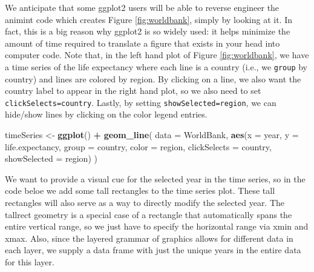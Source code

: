 \documentclass[12pt,]{article}
\newenvironment{Shaded}{\begin{snugshade}}{\end{snugshade}}
\newcommand{\KeywordTok}[1]{\textcolor[rgb]{0.13,0.29,0.53}{\textbf{#1}}}
\newcommand{\DataTypeTok}[1]{\textcolor[rgb]{0.13,0.29,0.53}{#1}}
\newcommand{\FloatTok}[1]{\textcolor[rgb]{0.00,0.00,0.81}{#1}}
\newcommand{\StringTok}[1]{\textcolor[rgb]{0.31,0.60,0.02}{#1}}
\newcommand{\OperatorTok}[1]{\textcolor[rgb]{0.81,0.36,0.00}{\textbf{#1}}}
\newcommand{\NormalTok}[1]{#1}
\theoremstyle{definition}
\theoremstyle{definition}
\theoremstyle{remark}
\begin{document}
We anticipate that some ggplot2 users will be able to reverse engineer
the animint code which creates Figure \ref{fig:worldbank}, simply by
looking at it. In fact, this is a big reason why ggplot2 is so widely
used: it helps minimize the amount of time required to translate a
figure that exists in your head into computer code. Note that, in the
left hand plot of Figure \ref{fig:worldbank}, we have a time series of
the life expectancy where each line is a country (i.e., we
\texttt{group} by country) and lines are colored by region. By clicking
on a line, we also want the country label to appear in the right hand
plot, so we also need to set \texttt{clickSelects=country}. Lastly, by
setting \texttt{showSelected=region}, we can hide/show lines by clicking
on the color legend entries.

\begin{Shaded}
\begin{Highlighting}[]
\NormalTok{timeSeries <-}\StringTok{ }\KeywordTok{ggplot}\NormalTok{() }\OperatorTok{+}\StringTok{ }\KeywordTok{geom_line}\NormalTok{(}
  \DataTypeTok{data =}\NormalTok{ WorldBank,}
  \KeywordTok{aes}\NormalTok{(}\DataTypeTok{x =}\NormalTok{ year, }\DataTypeTok{y =}\NormalTok{ life.expectancy,}
      \DataTypeTok{group =}\NormalTok{ country, }\DataTypeTok{color =}\NormalTok{ region,}
      \DataTypeTok{clickSelects =}\NormalTok{ country, }
      \DataTypeTok{showSelected =}\NormalTok{ region)}
\NormalTok{)}
\end{Highlighting}
\end{Shaded}

We want to provide a visual cue for the selected year in the time
series, so in the code beloe we add some tall rectangles to the time
series plot. These tall rectangles will also serve as a way to directly
modify the selected year. The tallrect geometry is a special case of a
rectangle that automatically spans the entire vertical range, so we just
have to specify the horizontal range via xmin and xmax. Also, since the
layered grammar of graphics allows for different data in each layer, we
supply a data frame with just the unique years in the entire data for
this layer.

\begin{Shaded}
\end{Shaded}
\end{document}

